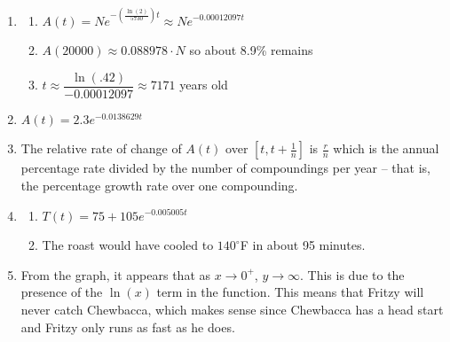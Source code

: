 \begin{enumerate}
\begin{enumerate}
\begin{multicols}{6}
\begin{itemize}
\item $\approx 2.500$

\item $\approx 2.498$

\item$\approx 2.487$

\end{itemize}

\end{multicols}

\end{enumerate}

\pagebreak

\item \begin{enumerate}

\item $A(t) = Ne^{-\left(\frac{\ln(2)}{5730}\right)t} \approx Ne^{-0.00012097t}$
\item $A(20000) \approx 0.088978 \cdot N$ so about 8.9\% remains
\item $t \approx \dfrac{\ln(.42)}{-0.00012097} \approx 7171$ years old

\end{enumerate}

\item $A(t) = 2.3e^{-0.0138629t}$

\item  The relative rate of change of $A(t)$ over $\left[t, t+\frac{1}{n} \right]$ is $\frac{r}{n}$ which is the annual percentage rate divided by the number of compoundings per year -- that is,  the percentage growth rate over one compounding.

\addtocounter{enumi}{1}

\item \begin{enumerate}

\item $T(t) = 75 + 105e^{-0.005005t}$

\item The roast would have cooled to $140^{\circ}$F in about 95 minutes.

\end{enumerate}

\item From the graph, it appears that as $x \rightarrow 0^{+}$, $y \rightarrow \infty$.  This is due to the presence of the $\ln(x)$ term in the function.  This means that Fritzy will never catch Chewbacca, which makes sense since Chewbacca has a head start and Fritzy only runs as fast as he does.


\end{enumerate}
